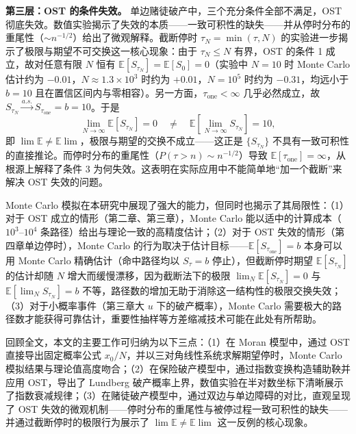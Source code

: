 \textbf{第三层：OST 的条件失效。} 单边赌徒破产中，三个充分条件全部不满足，OST 彻底失效。数值实验揭示了失效的本质——一致可积性的缺失——并从停时分布的重尾性（$\sim n^{-1/2}$）给出了微观解释。截断停时 $\tau_N = \min(\tau, N)$ 的实验进一步揭示了极限与期望不可交换这一核心现象：由于 $\tau_N \leqslant N$ 有界，OST 的条件 1 成立，故对任意有限 $N$ 恒有 $\mathbb{E}[S_{\tau_N}] = \mathbb{E}[S_0] = 0$（实验中 $N=10$ 时 Monte Carlo 估计约为 $-0.01$，$N\approx 1.3\times 10^3$ 时约为 $+0.01$，$N=10^5$ 时约为 $-0.31$，均远小于 $b=10$ 且在置信区间内与零相容）。另一方面，$\tau_{\text{one}} < \infty$ 几乎必然成立，故 $S_{\tau_N} \xrightarrow{a.s.} S_{\tau_{\text{one}}} = b = 10$。于是
\begin{equation}
  \lim_{N\to\infty} \mathbb{E}[S_{\tau_N}] = 0 \quad \neq \quad
  \mathbb{E}\!\left[\lim_{N\to\infty} S_{\tau_N}\right] = 10,
\end{equation}
即 $\lim\mathbb{E} \neq \mathbb{E}\lim$，极限与期望的交换不成立——这正是 $\{S_{\tau_N}\}$ 不具有一致可积性的直接推论。而停时分布的重尾性（$P(\tau > n) \sim n^{-1/2}$）导致 $\mathbb{E}[\tau_{\text{one}}] = \infty$，从根源上解释了条件 3 为何失效。这表明在实际应用中不能简单地``加一个截断''来解决 OST 失效的问题。

Monte Carlo 模拟在本研究中展现了强大的能力，但同时也揭示了其局限性：（1）对于 OST 成立的情形（第二章、第三章），Monte Carlo 能以适中的计算成本（$10^3$--$10^4$ 条路径）给出与理论一致的高精度估计；（2）对于 OST 失效的情形（第四章单边停时），Monte Carlo 的行为取决于估计目标——$\mathbb{E}[S_{\tau_{\text{one}}}] = b$ 本身可以用 Monte Carlo 精确估计（命中路径均以 $S_\tau = b$ 停止），但截断停时期望 $\mathbb{E}[S_{\tau_N}]$ 的估计却随 $N$ 增大而缓慢漂移，因为截断法下的极限 $\lim_N \mathbb{E}[S_{\tau_N}] = 0$ 与 $\mathbb{E}[\lim_N S_{\tau_N}] = b$ 不等，路径数的增加无助于消除这一结构性的极限交换失效；（3）对于小概率事件（第三章大 $u$ 下的破产概率），Monte Carlo 需要极大的路径数才能获得可靠估计，重要性抽样等方差缩减技术可能在此处有所帮助。

回顾全文，本文的主要工作可归纳为以下三点：（1）在 Moran 模型中，通过 OST 直接导出固定概率公式 $x_0/N$，并以三对角线性系统求解期望停时，Monte Carlo 模拟结果与理论值高度吻合；（2）在保险破产模型中，通过指数变换构造辅助鞅并应用 OST，导出了 Lundberg 破产概率上界，数值实验在半对数坐标下清晰展示了指数衰减规律；（3）在赌徒破产模型中，通过双边与单边障碍的对比，直观呈现了 OST 失效的微观机制——停时分布的重尾性与被停过程一致可积性的缺失——并通过截断停时的极限行为展示了 $\lim\mathbb{E} \neq \mathbb{E}\lim$ 这一反例的核心现象。

